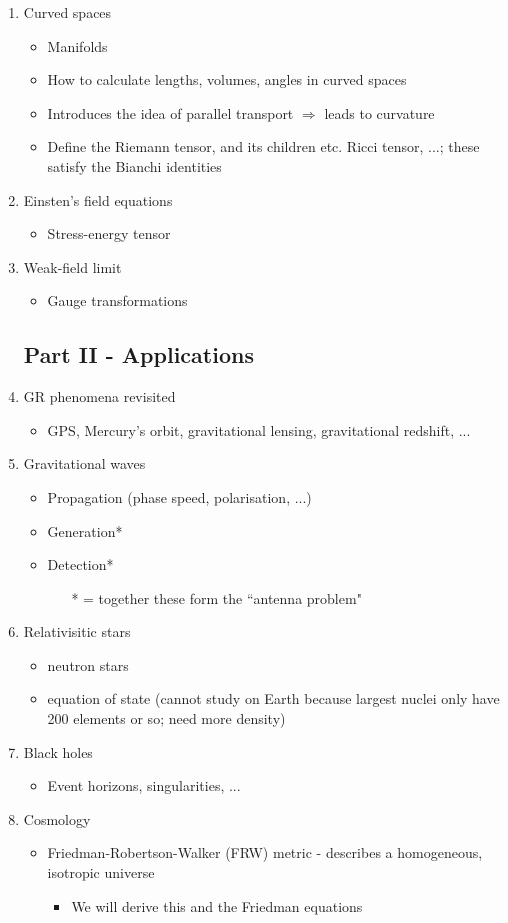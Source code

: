 \documentclass[a4paper]{article} %
\begin{document}
\begin{enumerate}
\item Curved spaces
\begin{itemize}
\item Manifolds 
\item How to calculate lengths, volumes, angles in curved spaces
\item Introduces the idea of parallel transport $\Rightarrow$ leads to curvature
\item Define the Riemann tensor, and its children etc. Ricci tensor, ...; these satisfy the Bianchi identities
\end{itemize}
\item Einsten's field equations
\begin{itemize}
\item Stress-energy tensor
\end{itemize}
\item Weak-field limit
\begin{itemize}
\item Gauge transformations
\end{itemize}
\subsection{Part II - Applications}
\item GR phenomena revisited 
\begin{itemize}
\item GPS, Mercury's orbit, gravitational lensing, gravitational redshift, ...
\end{itemize}
\item Gravitational waves
\begin{itemize}
\item Propagation (phase speed, polarisation, ...)
\item Generation*
\item Detection*
\begin{itemize}
\item[*] = together these form the ``antenna problem"
\end{itemize}
\end{itemize}
\item Relativisitic stars
\begin{itemize}
\item neutron stars
\item equation of state (cannot study on Earth because largest nuclei only have 200 elements or so; need more density)
\end{itemize}
\item Black holes
\begin{itemize}
\item Event horizons, singularities, ...
\end{itemize}
\item Cosmology
\begin{itemize}
\item Friedman-Robertson-Walker (FRW) metric - describes a homogeneous, isotropic universe
\begin{itemize}
\item We will derive this and the Friedman equations
\end{itemize}
\end{itemize}


\end{enumerate}
\end{document}
